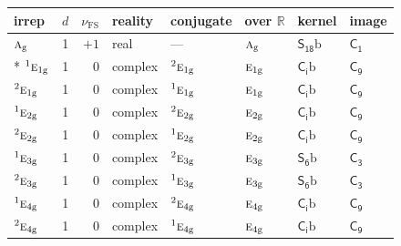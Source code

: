 \documentclass[10pt,a4paper]{article}
\numberwithin{equation}{section}
\newcommand{\grp}[1]{\mathsf{#1}}
\newcommand{\irr}[1]{\text{\normalfont\scshape #1}}
\newcommand{\conjpair}[1]{{}^{#1}}
\newcommand{\ptag}[1]{\mathrm{#1}}
\newcommand{\fsind}{\nu_{\mathrm{FS}}}
\newcommand{\secondclass}{\mathrm{b}}
\begin{document}
{\small\renewcommand{\arraystretch}{1.25}\setlength{\tabcolsep}{4pt}\begin{longtable}{@{}lrrlllll@{}}\toprule
irrep & $d$ & $\fsind$ & reality & conjugate & over $\mathbb{R}$ & kernel & image\\\midrule\endhead
\bottomrule\endfoot\endlastfoot
$\irr{a}_{\ptag{g}}$ & 1 & $+1$ & real & --- & $\irr{a}_{\ptag{g}}$ & \href{S18b.pdf}{$\grp{S_{18}}\secondclass$} & \href{../../../rotation/data/pdf/C1.pdf}{$\grp{C_{1}}$}\\*
$\conjpair{1}\irr{e}_{1\ptag{g}}$ & 1 & $0$ & complex & $\conjpair{2}\irr{e}_{1\ptag{g}}$ & $\irr{e}_{1\ptag{g}}$ & \href{S2b.pdf}{$\grp{C_{i}}\secondclass$} & \href{../../../rotation/data/pdf/C9.pdf}{$\grp{C_{9}}$}\\
$\conjpair{2}\irr{e}_{1\ptag{g}}$ & 1 & $0$ & complex & $\conjpair{1}\irr{e}_{1\ptag{g}}$ & $\irr{e}_{1\ptag{g}}$ & \href{S2b.pdf}{$\grp{C_{i}}\secondclass$} & \href{../../../rotation/data/pdf/C9.pdf}{$\grp{C_{9}}$}\\
$\conjpair{1}\irr{e}_{2\ptag{g}}$ & 1 & $0$ & complex & $\conjpair{2}\irr{e}_{2\ptag{g}}$ & $\irr{e}_{2\ptag{g}}$ & \href{S2b.pdf}{$\grp{C_{i}}\secondclass$} & \href{../../../rotation/data/pdf/C9.pdf}{$\grp{C_{9}}$}\\
$\conjpair{2}\irr{e}_{2\ptag{g}}$ & 1 & $0$ & complex & $\conjpair{1}\irr{e}_{2\ptag{g}}$ & $\irr{e}_{2\ptag{g}}$ & \href{S2b.pdf}{$\grp{C_{i}}\secondclass$} & \href{../../../rotation/data/pdf/C9.pdf}{$\grp{C_{9}}$}\\
$\conjpair{1}\irr{e}_{3\ptag{g}}$ & 1 & $0$ & complex & $\conjpair{2}\irr{e}_{3\ptag{g}}$ & $\irr{e}_{3\ptag{g}}$ & \href{S6b.pdf}{$\grp{S_{6}}\secondclass$} & \href{../../../rotation/data/pdf/C3.pdf}{$\grp{C_{3}}$}\\
$\conjpair{2}\irr{e}_{3\ptag{g}}$ & 1 & $0$ & complex & $\conjpair{1}\irr{e}_{3\ptag{g}}$ & $\irr{e}_{3\ptag{g}}$ & \href{S6b.pdf}{$\grp{S_{6}}\secondclass$} & \href{../../../rotation/data/pdf/C3.pdf}{$\grp{C_{3}}$}\\
$\conjpair{1}\irr{e}_{4\ptag{g}}$ & 1 & $0$ & complex & $\conjpair{2}\irr{e}_{4\ptag{g}}$ & $\irr{e}_{4\ptag{g}}$ & \href{S2b.pdf}{$\grp{C_{i}}\secondclass$} & \href{../../../rotation/data/pdf/C9.pdf}{$\grp{C_{9}}$}\\
$\conjpair{2}\irr{e}_{4\ptag{g}}$ & 1 & $0$ & complex & $\conjpair{1}\irr{e}_{4\ptag{g}}$ & $\irr{e}_{4\ptag{g}}$ & \href{S2b.pdf}{$\grp{C_{i}}\secondclass$} & \href{../../../rotation/data/pdf/C9.pdf}{$\grp{C_{9}}$}\\

\end{longtable}}
\end{document}
